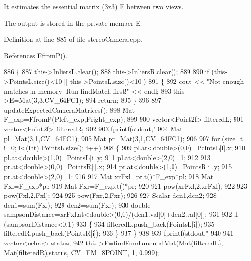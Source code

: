 It estimates the essential matrix (3x3) E between two views. 

The output is stored in the private member E. 

Definition at line 885 of file stereo\+Camera.\+cpp.



References Ffrom\+P().


\begin{DoxyCode}
886 \{
887     this->InliersL.clear();
888     this->InliersR.clear();
889 
890     \textcolor{keywordflow}{if} (this->PointsL.size()<10 || this->PointsL.size()<10 )
891     \{
892         cout << \textcolor{stringliteral}{"Not enough matches in memory! Run findMatch first!"} << endl;
893         this->E=Mat(3,3,CV\_64FC1);
894         \textcolor{keywordflow}{return};
895     \}
896 
897     updateExpectedCameraMatrices();
898     Mat F\_exp=FfromP(Pleft\_exp,Pright\_exp);
899 
900     vector<Point2f> filteredL;
901     vector<Point2f> filteredR;
902 
903     fprintf(stdout,\textcolor{stringliteral}{"%
904     Mat pl=Mat(3,1,CV\_64FC1);
905     Mat pr=Mat(3,1,CV\_64FC1);
906 
907     \textcolor{keywordflow}{for} (\textcolor{keywordtype}{size\_t} i=0; i<(int) PointsL.size(); i++)
908     \{
909         pl.at<\textcolor{keywordtype}{double}>(0,0)=PointsL[i].x;
910         pl.at<\textcolor{keywordtype}{double}>(1,0)=PointsL[i].y;
911         pl.at<\textcolor{keywordtype}{double}>(2,0)=1;
912         
913         pr.at<\textcolor{keywordtype}{double}>(0,0)=PointsR[i].x;
914         pr.at<\textcolor{keywordtype}{double}>(1,0)=PointsR[i].y;
915         pr.at<\textcolor{keywordtype}{double}>(2,0)=1;
916              
917         Mat xrFxl=pr.t()*F\_exp*pl;
918         Mat Fxl=F\_exp*pl;
919         Mat Fxr=F\_exp.t()*pr;
920 
921         pow(xrFxl,2,xrFxl);
922 
923         pow(Fxl,2,Fxl);
924 
925         pow(Fxr,2,Fxr);
926         
927         Scalar den1,den2;
928         den1=sum(Fxl);
929         den2=sum(Fxr);
930         \textcolor{keywordtype}{double} sampsonDistance=xrFxl.at<\textcolor{keywordtype}{double}>(0,0)/(den1.val[0]+den2.val[0]);
931         
932         \textcolor{keywordflow}{if} (sampsonDistance<0.1)
933         \{
934             filteredL.push\_back(PointsL[i]);
935             filteredR.push\_back(PointsR[i]);
936         \}
937     \}
938 
939     fprintf(stdout,\textcolor{stringliteral}{"%
940 
941     vector<uchar> status;
942     this->F=findFundamentalMat(Mat(filteredL), Mat(filteredR),status, CV\_FM\_8POINT, 1, 0.999);
}}
\end{DoxyCode}
